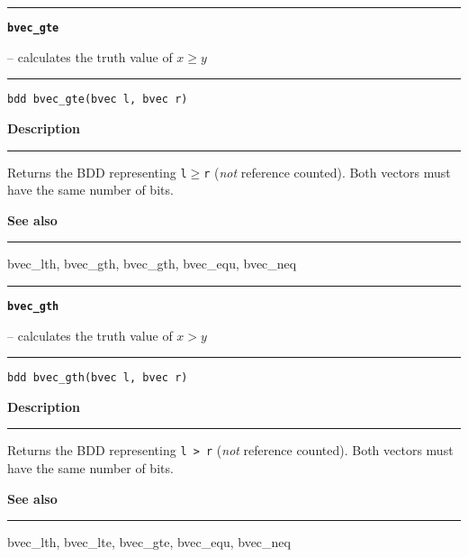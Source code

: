 \vspace{8ex}
\begin{minipage}{\textwidth}

\noindent\begin{minipage}{\textwidth}
\rule{\textwidth}{0.5mm}
{\tt\bf bvec\_gte }
\--- calculates the truth value of $x \geq y$  \hspace{\fill}
\\\rule[1.5ex]{\textwidth}{0.5mm}
\end{minipage}

\noindent\begin{verbatim}
bdd bvec_gte(bvec l, bvec r) 
\end{verbatim}

\vspace{\parsep}\noindent
{\bf Description}\\\rule[1.5ex]{\textwidth}{0.2mm}\vspace{-1.5ex}\setlength{\parindent}{1em}
Returns the BDD representing {\tt l}$\geq${\tt r}
           ({\em not} reference counted). Both vectors must have the
	   same number of bits. 

\vspace{\parsep}\vspace{\baselineskip}\noindent
{\bf See also}\\\rule[1.5ex]{\textwidth}{0.2mm}\vspace{-1.5ex}
bvec\_lth, bvec\_gth, bvec\_gth, bvec\_equ, bvec\_neq 
\end{minipage}
\vspace{8ex}
\begin{minipage}{\textwidth}

\noindent\begin{minipage}{\textwidth}
\rule{\textwidth}{0.5mm}
{\tt\bf bvec\_gth }
\--- calculates the truth value of $x > y$  \hspace{\fill}
\\\rule[1.5ex]{\textwidth}{0.5mm}
\end{minipage}

\noindent\begin{verbatim}
bdd bvec_gth(bvec l, bvec r) 
\end{verbatim}

\vspace{\parsep}\noindent
{\bf Description}\\\rule[1.5ex]{\textwidth}{0.2mm}\vspace{-1.5ex}\setlength{\parindent}{1em}
Returns the BDD representing {\tt l > r}
           ({\em not} reference counted). Both vectors must have the
	   same number of bits. 

\vspace{\parsep}\vspace{\baselineskip}\noindent
{\bf See also}\\\rule[1.5ex]{\textwidth}{0.2mm}\vspace{-1.5ex}
bvec\_lth, bvec\_lte, bvec\_gte, bvec\_equ, bvec\_neq 
\end{minipage}
